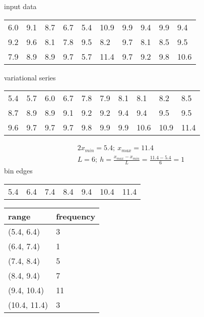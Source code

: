 \documentclass{article}%
\begin{document}
%
\normalsize%
input data%
\begin{longtable}{l l l l l l l l l l }%
6.0&9.1&8.7&6.7&5.4&10.9&9.9&9.4&9.9&9.4\\%
9.2&9.6&8.1&7.8&9.5&8.2&9.7&8.1&8.5&9.5\\%
7.9&8.9&8.9&9.7&5.7&11.4&9.7&9.2&9.8&10.6\\%
\end{longtable}%
variational series%
\begin{longtable}{l l l l l l l l l l }%
5.4&5.7&6.0&6.7&7.8&7.9&8.1&8.1&8.2&8.5\\%
8.7&8.9&8.9&9.1&9.2&9.2&9.4&9.4&9.5&9.5\\%
9.6&9.7&9.7&9.7&9.8&9.9&9.9&10.6&10.9&11.4\\%
\end{longtable}%
\begin{alignat*}{2}%
x_{min} = 5.4; ~ x_{max} = 11.4 \\%
L = 6;
            ~ h = \frac { x_{max} - x_{min} } L
                = \frac { 11.4 - 5.4 } 6
                = 1%
\end{alignat*}%
bin edges%
\begin{longtable}{l l l l l l l }%
5.4&6.4&7.4&8.4&9.4&10.4&11.4\\%
\end{longtable}%
\begin{longtable}{l l }%
\hline%
range&frequency\\%
\hline%
\endhead%
(5.4, 6.4)&3\\%
(6.4, 7.4)&1\\%
(7.4, 8.4)&5\\%
(8.4, 9.4)&7\\%
(9.4, 10.4)&11\\%
(10.4, 11.4)&3\\%
\hline%
\end{longtable}%
\end{document}
